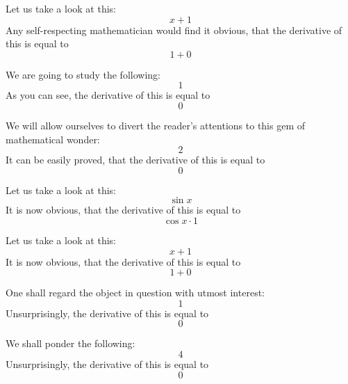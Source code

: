 \documentclass{article}
\begin{document}
Let us take a look at this:
\begin{equation}
x + 1 
\end{equation}
Any self-respecting mathematician would find it obvious, that the derivative of this is equal to
\begin{equation}
1 + 0 
\end{equation}

We are going to study the following:
\begin{equation}
1 
\end{equation}
As you can see, the derivative of this is equal to
\begin{equation}
0 
\end{equation}

We will allow ourselves to divert the reader's attentions to this gem of mathematical wonder:
\begin{equation}
2 
\end{equation}
It can be easily proved, that the derivative of this is equal to
\begin{equation}
0 
\end{equation}

Let us take a look at this:
\begin{equation}
\sin x 
\end{equation}
It is now obvious, that the derivative of this is equal to
\begin{equation}
\cos x \cdot 1 
\end{equation}

Let us take a look at this:
\begin{equation}
x + 1 
\end{equation}
It is now obvious, that the derivative of this is equal to
\begin{equation}
1 + 0 
\end{equation}

One shall regard the object in question with utmost interest:
\begin{equation}
1 
\end{equation}
Unsurprisingly, the derivative of this is equal to
\begin{equation}
0 
\end{equation}

We shall ponder the following:
\begin{equation}
4 
\end{equation}
Unsurprisingly, the derivative of this is equal to
\begin{equation}
0 
\end{equation}
\end{document}
